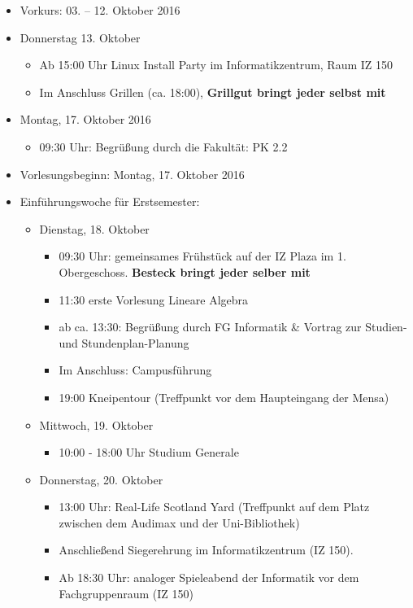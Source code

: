 \begin{itemize}
	\item Vorkurs: 03. – 12. Oktober 2016
	
	\item Donnerstag 13. Oktober
	\begin{itemize}
		\item Ab 15:00 Uhr Linux Install Party im Informatikzentrum, Raum IZ 150
		\item Im Anschluss Grillen (ca. 18:00), \textbf{Grillgut bringt jeder selbst mit}
	\end{itemize}

	\item Montag, 17. Oktober 2016
	\begin{itemize}
		\item 09:30 Uhr: Begrüßung durch die Fakultät: PK 2.2
	\end{itemize}

	\item Vorlesungsbeginn: Montag, 17. Oktober 2016

	\item Einführungswoche für Erstsemester:
	\begin{itemize}
		\item Dienstag, 18. Oktober
		\begin{itemize}
			\item 09:30 Uhr: gemeinsames Frühstück auf der IZ Plaza im 1. Obergeschoss. \textbf{Besteck bringt jeder selber mit}
			\item 11:30 erste Vorlesung Lineare Algebra
			\item ab ca. 13:30: Begrüßung durch FG Informatik \& Vortrag zur Studien- und Stundenplan-Planung
			\item Im Anschluss: Campusführung
			\item 19:00 Kneipentour (Treffpunkt vor dem Haupteingang der Mensa)
		\end{itemize}

		\item Mittwoch, 19. Oktober
		\begin{itemize}
			\item 10:00 - 18:00 Uhr Studium Generale
		\end{itemize}

		\item Donnerstag, 20. Oktober
		\begin{itemize}
			\item 13:00 Uhr: Real-Life Scotland Yard (Treffpunkt auf dem Platz zwischen dem Audimax und der Uni-Bibliothek)
			\item Anschließend Siegerehrung im Informatikzentrum (IZ 150).
			\item Ab 18:30 Uhr: analoger Spieleabend der Informatik vor dem Fachgruppenraum (IZ 150)
		\end{itemize}
	\end{itemize}


\end{itemize}
